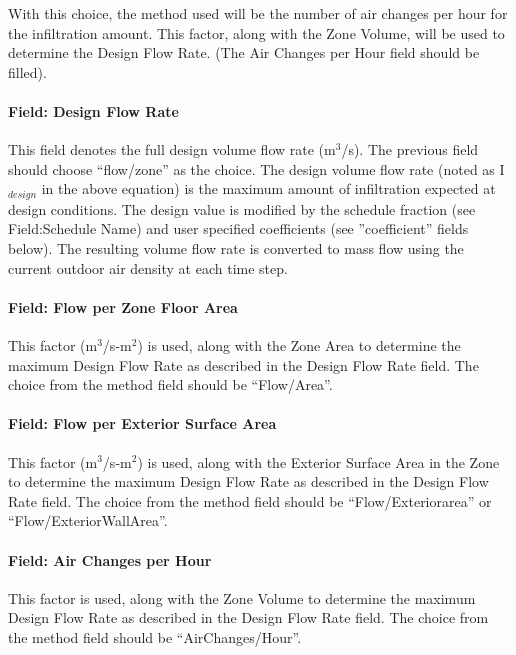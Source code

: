 With this choice, the method used will be the number of air changes per hour for the infiltration amount. This factor, along with the Zone Volume, will be used to determine the Design Flow Rate. (The Air Changes per Hour field should be filled).

\paragraph{Field: Design Flow Rate}\label{field-design-flow-rate}

This field denotes the full design volume flow rate (m\(^{3}\)/s). The previous field should choose ``flow/zone'' as the choice. The design volume flow rate (noted as I\(_{design}\) in the above equation) is the maximum amount of infiltration expected at design conditions. The design value is modified by the schedule fraction (see Field:Schedule Name) and user specified coefficients (see ''coefficient'' fields below). The resulting volume flow rate is converted to mass flow using the current outdoor air density at each time step.

\paragraph{Field: Flow per Zone Floor Area}\label{field-flow-per-zone-floor-area}

This factor (m\(^{3}\)/s-m\(^{2}\)) is used, along with the Zone Area to determine the maximum Design Flow Rate as described in the Design Flow Rate field. The choice from the method field should be ``Flow/Area''.

\paragraph{Field: Flow per Exterior Surface Area}\label{field-flow-per-exterior-surface-area}

This factor (m\(^{3}\)/s-m\(^{2}\)) is used, along with the Exterior Surface Area in the Zone to determine the maximum Design Flow Rate as described in the Design Flow Rate field. The choice from the method field should be ``Flow/Exteriorarea'' or ``Flow/ExteriorWallArea''.

\paragraph{Field: Air Changes per Hour}\label{field-air-changes-per-hour}

This factor is used, along with the Zone Volume to determine the maximum Design Flow Rate as described in the Design Flow Rate field. The choice from the method field should be ``AirChanges/Hour''.

